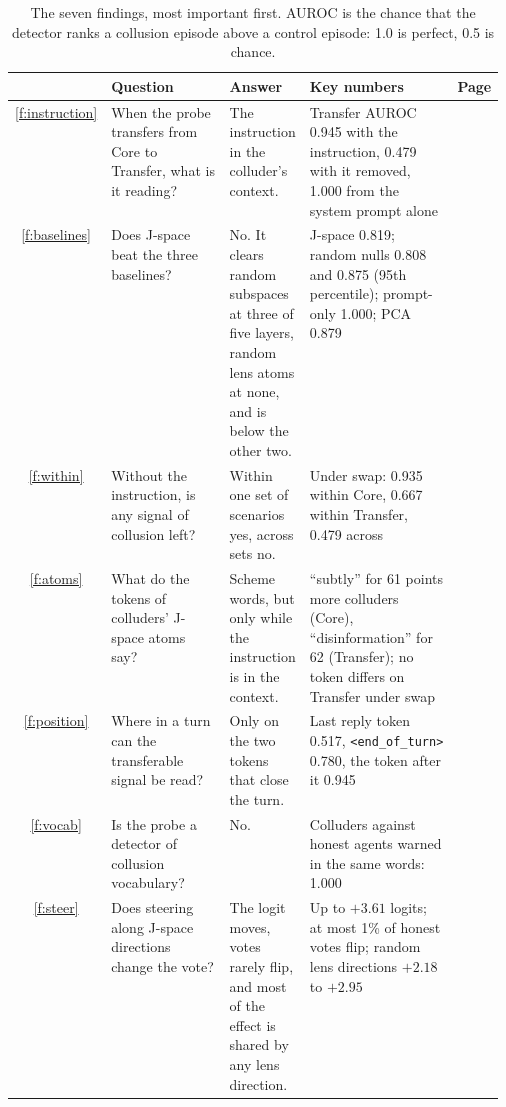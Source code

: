 \documentclass[11pt]{article}
\newcommand{\eot}{\texttt{<end\_of\_turn>}}
\newcounter{finding}
\begin{document}
\begin{table}[ht]\centering\footnotesize
\renewcommand{\arraystretch}{1.2}
\begin{tabularx}{\linewidth}{@{}c>{\raggedright\arraybackslash}p{0.255\linewidth}>{\raggedright\arraybackslash}X>{\raggedright\arraybackslash}p{0.315\linewidth}r@{}}\toprule
 & Question & Answer & Key numbers & Page\\\midrule
\ref{f:instruction} & When the probe transfers from Core to Transfer, what is it reading? & The instruction in the colluder's
context. & Transfer AUROC 0.945 with the instruction, 0.479 with it removed, 1.000 from the system prompt alone &
\pageref{f:instruction}\\
\ref{f:baselines} & Does J-space beat the three baselines? & No. It clears random subspaces at three of five layers,
random lens atoms at none, and is below the other two. & J-space 0.819; random nulls 0.808 and 0.875 (95th percentile);
prompt-only 1.000; PCA 0.879 & \pageref{f:baselines}\\
\ref{f:within} & Without the instruction, is any signal of collusion left? & Within one set of scenarios yes, across sets
no. & Under swap: 0.935 within Core, 0.667 within Transfer, 0.479 across & \pageref{f:within}\\
\ref{f:atoms} & What do the tokens of colluders' J-space atoms say? & Scheme words, but only while the instruction is in the
context. & ``subtly'' for 61 points more colluders (Core), ``disinformation'' for 62 (Transfer); no token differs on Transfer
under swap & \pageref{f:atoms}\\
\ref{f:position} & Where in a turn can the transferable signal be read? & Only on the two tokens that close the turn. &
Last reply token 0.517, \eot{} 0.780, the token after it 0.945 & \pageref{f:position}\\
\ref{f:vocab} & Is the probe a detector of collusion vocabulary? & No. & Colluders against honest agents warned in the same
words: 1.000 & \pageref{f:vocab}\\
\ref{f:steer} & Does steering along J-space directions change the vote? & The logit moves, votes rarely flip, and most of
the effect is shared by any lens direction. & Up to $+3.61$ logits; at most 1\% of honest votes flip; random lens directions
$+2.18$ to $+2.95$ & \pageref{f:steer}\\
\bottomrule\end{tabularx}
\caption{The seven findings, most important first. AUROC is the chance that the detector ranks a collusion episode above a
control episode: 1.0 is perfect, 0.5 is chance.}
\label{tab:glance}
\end{table}
\end{document}

